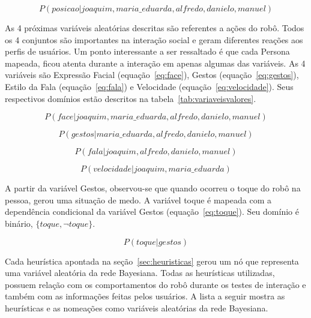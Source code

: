 \begin{equation}
	\label{eq:posicao}
	P(posicao | joaquim, maria\_eduarda, alfredo, danielo, manuel)
\end{equation}

As 4 próximas variáveis aleatórias descritas são referentes a ações do robô. Todos os 4 conjuntos são importantes na interação social e geram diferentes reações aos perfis de usuários. Um ponto interessante a ser ressaltado é que cada Persona mapeada, ficou atenta durante a interação em apenas algumas das variáveis. As 4 variáveis são Expressão Facial (equação~\ref{eq:face}), Gestos (equação~\ref{eq:gestos}), Estilo da Fala (equação~\ref{eq:fala}) e Velocidade (equação~\ref{eq:velocidade}). Seus respectivos domínios estão descritos na tabela~\ref{tab:variaveisvalores}.

\begin{equation}
	\label{eq:face}
	P(face | joaquim, maria\_eduarda, alfredo, danielo, manuel)
\end{equation}

\begin{equation}
	\label{eq:gestos}
	P(gestos | maria\_eduarda, alfredo, danielo, manuel)
\end{equation}

\begin{equation}
	\label{eq:fala}
	P(fala | joaquim, alfredo, danielo, manuel)
\end{equation}

\begin{equation}
	\label{eq:velocidade}
	P(velocidade | joaquim, maria\_eduarda)
\end{equation}

A partir da variável Gestos, observou-se que quando ocorreu o toque do robô na pessoa, gerou uma situação de medo. A variável toque é mapeada com a dependência condicional da variável Gestos (equação~\ref{eq:toque}). Seu domínio é binário, $\{toque, \neg toque\}$.

\begin{equation}
	\label{eq:toque}
	P(toque | gestos)
\end{equation}

Cada heurística apontada na seção~\ref{sec:heuristicas} gerou um nó que representa uma variável aleatória da rede Bayesiana. Todas as heurísticas utilizadas, possuem relação com os comportamentos do robô durante os testes de interação e também com as informações feitas pelos usuários. A lista a seguir mostra as heurísticas e as nomeações como variáveis aleatórias da rede Bayesiana.

